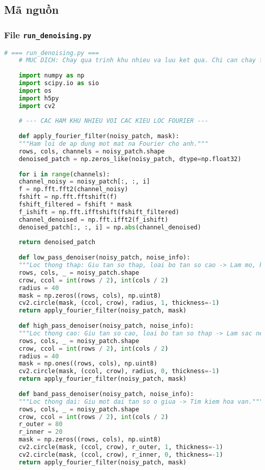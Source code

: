 \documentclass[12pt, a4paper]{article}
\begin{document}
\subsection{Mã nguồn}
\subsubsection{File \texttt{run\_denoising.py}}
\begin{lstlisting}[language=Python, caption={Mã nguồn xử lý và khử nhiễu ảnh.}, label={lst:run_denoising}]
	# === run_denoising.py ===
	# MUC DICH: Chay qua trinh khu nhieu va luu ket qua. Chi can chay file nay mot lan.
	
	import numpy as np
	import scipy.io as sio
	import os
	import h5py
	import cv2
	
	# --- CAC HAM KHU NHIEU VOI CAC KIEU LOC FOURIER ---
	
	def apply_fourier_filter(noisy_patch, mask):
	"""Ham loi de ap dung mot mat na Fourier cho anh."""
	rows, cols, channels = noisy_patch.shape
	denoised_patch = np.zeros_like(noisy_patch, dtype=np.float32)
	
	for i in range(channels):
	channel_noisy = noisy_patch[:, :, i]
	f = np.fft.fft2(channel_noisy)
	fshift = np.fft.fftshift(f)
	fshift_filtered = fshift * mask
	f_ishift = np.fft.ifftshift(fshift_filtered)
	channel_denoised = np.fft.ifft2(f_ishift)
	denoised_patch[:, :, i] = np.abs(channel_denoised)
	
	return denoised_patch
	
	def low_pass_denoiser(noisy_patch, noise_info):
	"""Loc thong thap: Giu tan so thap, loai bo tan so cao -> Lam mo, khu nhieu."""
	rows, cols, _ = noisy_patch.shape
	crow, ccol = int(rows / 2), int(cols / 2)
	radius = 40
	mask = np.zeros((rows, cols), np.uint8)
	cv2.circle(mask, (ccol, crow), radius, 1, thickness=-1)
	return apply_fourier_filter(noisy_patch, mask)
	
	def high_pass_denoiser(noisy_patch, noise_info):
	"""Loc thong cao: Giu tan so cao, loai bo tan so thap -> Lam sac net, phat hien canh."""
	rows, cols, _ = noisy_patch.shape
	crow, ccol = int(rows / 2), int(cols / 2)
	radius = 40
	mask = np.ones((rows, cols), np.uint8)
	cv2.circle(mask, (ccol, crow), radius, 0, thickness=-1)
	return apply_fourier_filter(noisy_patch, mask)
	
	def band_pass_denoiser(noisy_patch, noise_info):
	"""Loc thong dai: Giu mot dai tan so o giua -> Tim kiem hoa van."""
	rows, cols, _ = noisy_patch.shape
	crow, ccol = int(rows / 2), int(cols / 2)
	r_outer = 80
	r_inner = 20
	mask = np.zeros((rows, cols), np.uint8)
	cv2.circle(mask, (ccol, crow), r_outer, 1, thickness=-1)
	cv2.circle(mask, (ccol, crow), r_inner, 0, thickness=-1)
	return apply_fourier_filter(noisy_patch, mask)
	

\end{lstlisting}
\end{document}
